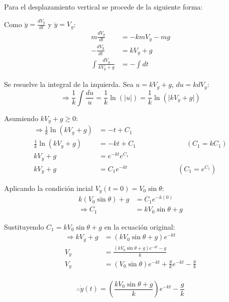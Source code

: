 Para el desplazamiento vertical se procede de la siguiente forma:
\vspace{5 mm}

Como $\ddot{y}=\frac{dV_{y}}{dt}$ y $\dot{y}=V_{y}$:
\begin{align*}
    m\frac{dV_{y}}{dt} &= -kmV_{y}-mg\\
    -\frac{dV_{y}}{dt} &= kV_{y}+g\\
    \int \frac{dV_{y}}{kV_{y}+g} &= -\int dt
\end{align*}

\vspace{5 mm}
Se resuelve la integral de la izquierda. Sea $u=kV_{y}+g$, $du=kdV_{y}$:
\begin{equation*}
    \Rightarrow \frac{1}{k} \int \frac{du}{u} = \frac{1}{k} \ln(\lvert u \rvert) = \frac{1}{k} \ln(\lvert kV_{y}+g \rvert)
\end{equation*}

\vspace{5 mm}
Asumiendo $kV_{y}+g \geq 0$:
\begin{align*}
    \Rightarrow \frac{1}{k} \ln(kV_{y}+g) &= -t+C_{1}\\
    \frac{1}{k} \ln(kV_{y}+g) &= -kt+C_{1} \hspace{3cm} (C_{1}=kC_{1})\\
    kV_{y}+g &= e^{-kt}e^{C_{1}}\\
    kV_{y}+g &= C_{1}e^{-kt} \hspace{3cm} (C_{1}=e^{C_{1}})
\end{align*}

\vspace{5 mm}
Aplicando la condición incial $V_{y}(t=0)=V_{0}\sin\theta$:
\begin{align*}
    k(V_{0}\sin\theta)+g &= C_{1}e^{-k(0)}\\
    \Rightarrow C_{1} &= kV_{0}\sin\theta+g
\end{align*}

\vspace{5 mm}
Sustituyendo $C_{1} = kV_{0}\sin\theta+g$ en la ecuación original:
\begin{align*}
    \Rightarrow kV_{y}+g &= (kV_{0}\sin\theta+g)e^{-kt}\\
    V_{y} &= \frac{(kV_{0}\sin\theta+g)e^{-kt}-g}{k}\\
    V_{y} &= (V_{0}\sin\theta)e^{-kt} + \frac{g}{k}e^{-kt} - \frac{g}{k}\\
\end{align*}

\begin{equation*}
    \therefore \dot{y}(t) = \left (\frac{kV_{0}\sin\theta+g}{k} \right)e^{-kt} - \frac{g}{k}
\end{equation*}

